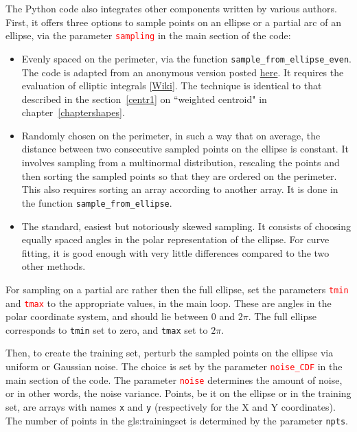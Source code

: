 \documentclass[oneside,10pt]{book}
\begin{document}
\noindent The Python code also integrates other components written by various authors. First, it offers three options to sample points on an ellipse or a partial arc of an ellipse, via the parameter \textcolor{red}{\texttt{sampling}} in the main section of the code: 
\begin{itemize}
\item Evenly spaced on the perimeter, via the function \texttt{sample\_from\_ellipse\_even}. The code is adapted from an anonymous version posted 
\href{https://math.stackexchange.com/questions/3710402/generate-random-points-on-perimeter-of-ellipse}{here}. It requires the evaluation of
 \textcolor{index}{elliptic integrals} [\href{https://en.wikipedia.org/wiki/Elliptic_integral}{Wiki}]. The technique is identical to that described in the section~\ref{centr1}  on ``weighted centroid" in chapter~\ref{chaptershapes}. 
\item Randomly chosen on the perimeter, in such a way that on average, the distance between two consecutive sampled points on the ellipse is constant. 
 It involves sampling from a multinormal distribution, rescaling the points and then sorting the sampled points so that they are ordered on the perimeter. This 
 also requires sorting an array according to another array.  It is done in the function
 \texttt{sample\_from\_ellipse}.
\item The standard, easiest but notoriously skewed sampling. It consists of choosing equally spaced angles in the polar representation of the ellipse. For curve fitting, it is good enough with very little differences compared to the two other methods.
\end{itemize}

\noindent For sampling on a partial arc rather then the full ellipse, set the parameters 
\textcolor{red}{\texttt{tmin}} and \textcolor{red}{\texttt{tmax}} to the appropriate values, in the main loop.
These are angles in the polar coordinate system, and should lie between $0$ and $2\pi$. The full ellipse corresponds to
 \texttt{tmin} set to zero, and \texttt{tmax} set to $2\pi$. \vspace{1ex}

\vspace{1ex}

\noindent Then, to create the training set, perturb the sampled points on the ellipse via uniform or Gaussian noise. 
 The choice is set by the parameter \textcolor{red}{\texttt{noise\_CDF}} in the main section of the code. The parameter 
\textcolor{red}{\texttt{noise}} determines the amount of noise, or in other words, the noise variance. Points, be it on the ellipse or in the training set,
 are arrays with names \texttt{x} and \texttt{y} (respectively for the X and Y coordinates). The number of points in the \gls{gls:trainingset} is determined
 by the parameter \textcolor{index}{\texttt{npts}}.
\end{document}
